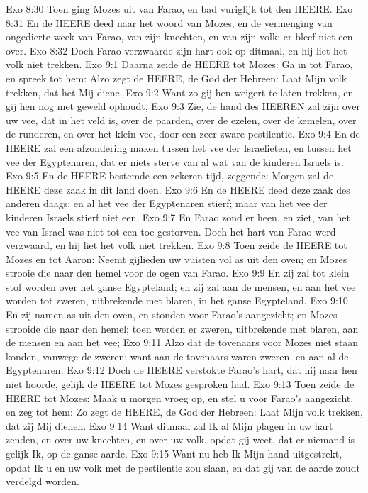 Exo 8:30  Toen ging Mozes uit van Farao, en bad vuriglijk tot den HEERE.
Exo 8:31  En de HEERE deed naar het woord van Mozes, en de vermenging van ongedierte week van Farao, van zijn knechten, en van zijn volk; er bleef niet een over.
Exo 8:32  Doch Farao verzwaarde zijn hart ook op ditmaal, en hij liet het volk niet trekken.
Exo 9:1  Daarna zeide de HEERE tot Mozes: Ga in tot Farao, en spreek tot hem: Alzo zegt de HEERE, de God der Hebreen: Laat Mijn volk trekken, dat het Mij diene.
Exo 9:2  Want zo gij hen weigert te laten trekken, en gij hen nog met geweld ophoudt,
Exo 9:3  Zie, de hand des HEEREN zal zijn over uw vee, dat in het veld is, over de paarden, over de ezelen, over de kemelen, over de runderen, en over het klein vee, door een zeer zware pestilentie.
Exo 9:4  En de HEERE zal een afzondering maken tussen het vee der Israelieten, en tussen het vee der Egyptenaren, dat er niets sterve van al wat van de kinderen Israels is.
Exo 9:5  En de HEERE bestemde een zekeren tijd, zeggende: Morgen zal de HEERE deze zaak in dit land doen.
Exo 9:6  En de HEERE deed deze zaak des anderen daags; en al het vee der Egyptenaren stierf; maar van het vee der kinderen Israels stierf niet een.
Exo 9:7  En Farao zond er heen, en ziet, van het vee van Israel was niet tot een toe gestorven. Doch het hart van Farao werd verzwaard, en hij liet het volk niet trekken.
Exo 9:8  Toen zeide de HEERE tot Mozes en tot Aaron: Neemt gijlieden uw vuisten vol as uit den oven; en Mozes strooie die naar den hemel voor de ogen van Farao.
Exo 9:9  En zij zal tot klein stof worden over het ganse Egypteland; en zij zal aan de mensen, en aan het vee worden tot zweren, uitbrekende met blaren, in het ganse Egypteland.
Exo 9:10  En zij namen as uit den oven, en stonden voor Farao's aangezicht; en Mozes strooide die naar den hemel; toen werden er zweren, uitbrekende met blaren, aan de mensen en aan het vee;
Exo 9:11  Alzo dat de tovenaars voor Mozes niet staan konden, vanwege de zweren; want aan de tovenaars waren zweren, en aan al de Egyptenaren.
Exo 9:12  Doch de HEERE verstokte Farao's hart, dat hij naar hen niet hoorde, gelijk de HEERE tot Mozes gesproken had.
Exo 9:13  Toen zeide de HEERE tot Mozes: Maak u morgen vroeg op, en stel u voor Farao's aangezicht, en zeg tot hem: Zo zegt de HEERE, de God der Hebreen: Laat Mijn volk trekken, dat zij Mij dienen.
Exo 9:14  Want ditmaal zal Ik al Mijn plagen in uw hart zenden, en over uw knechten, en over uw volk, opdat gij weet, dat er niemand is gelijk Ik, op de ganse aarde.
Exo 9:15  Want nu heb Ik Mijn hand uitgestrekt, opdat Ik u en uw volk met de pestilentie zou slaan, en dat gij van de aarde zoudt verdelgd worden.
